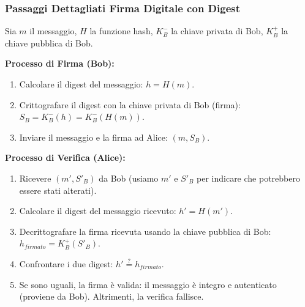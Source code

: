 \subsubsection{Passaggi Dettagliati Firma Digitale con Digest}
\label{ssubsec:firma_digest_dettagli}
Sia $m$ il messaggio, $H$ la funzione hash, $K_B^-$ la chiave privata di Bob, $K_B^+$ la chiave pubblica di Bob.

\textbf{Processo di Firma (Bob):}
\begin{enumerate}
    \item Calcolare il digest del messaggio: $h = H(m)$.
    \item Crittografare il digest con la chiave privata di Bob (firma): $S_B = K_B^-(h) = K_B^-(H(m))$.
    \item Inviare il messaggio e la firma ad Alice: $(m, S_B)$.
\end{enumerate}

\textbf{Processo di Verifica (Alice):}
\begin{enumerate}
    \item Ricevere $(m', S'_B)$ da Bob (usiamo $m'$ e $S'_B$ per indicare che potrebbero essere stati alterati).
    \item Calcolare il digest del messaggio ricevuto: $h' = H(m')$.
    \item Decrittografare la firma ricevuta usando la chiave pubblica di Bob: $h_{firmato} = K_B^+(S'_B)$.
    \item Confrontare i due digest: $h' \stackrel{?}{=} h_{firmato}$.
    \item Se sono uguali, la firma è valida: il messaggio è integro e autenticato (proviene da Bob). Altrimenti, la verifica fallisce.
\end{enumerate}


